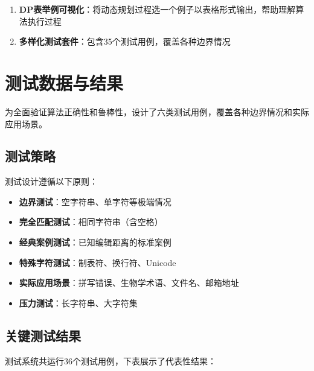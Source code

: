 \documentclass[a4paper]{article}
\begin{document}
\begin{enumerate}
	\item \textbf{DP表举例可视化}：将动态规划过程选一个例子以表格形式输出，帮助理解算法执行过程
	\item \textbf{多样化测试套件}：包含35个测试用例，覆盖各种边界情况
\end{enumerate}

\section{测试数据与结果}
为全面验证算法正确性和鲁棒性，设计了六类测试用例，覆盖各种边界情况和实际应用场景。

\subsection{测试策略}
测试设计遵循以下原则：
\begin{itemize}
	\item \textbf{边界测试}：空字符串、单字符等极端情况
	\item \textbf{完全匹配测试}：相同字符串（含空格）
	\item \textbf{经典案例测试}：已知编辑距离的标准案例
	\item \textbf{特殊字符测试}：制表符、换行符、Unicode
	\item \textbf{实际应用场景}：拼写错误、生物学术语、文件名、邮箱地址
	\item \textbf{压力测试}：长字符串、大字符集
\end{itemize}

\subsection{关键测试结果}
测试系统共运行36个测试用例，下表展示了代表性结果：
\end{document}
